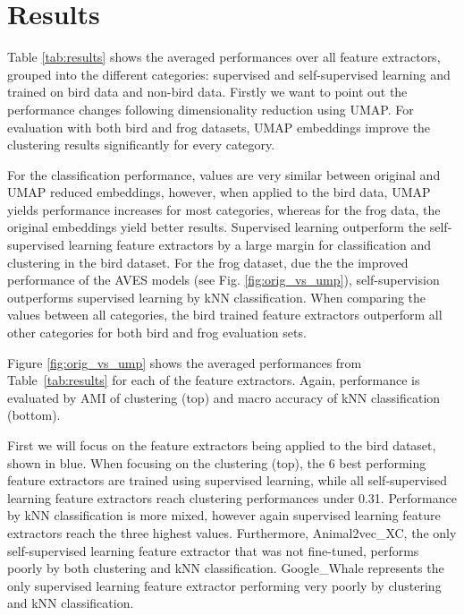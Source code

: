 \section{Results}
\label{sec:results}



Table \ref{tab:results} shows the averaged performances over all feature extractors, grouped into the different categories: supervised and self-supervised learning and trained on bird data and non-bird data.
Firstly we want to point out the performance changes following dimensionality reduction using UMAP.
For evaluation with both bird and frog datasets, UMAP embeddings improve the clustering results significantly for every category.

For the classification performance, values are very similar between original and UMAP reduced embeddings, however, when applied to the bird data, UMAP yields performance increases for most categories, whereas for the frog data, the original embeddings yield better results.
Supervised learning outperform the self-supervised learning feature extractors by a large margin for classification and clustering in the bird dataset.
For the frog dataset, due the the improved performance of the AVES models (see Fig. \ref{fig:orig_vs_ump}), self-supervision outperforms supervised learning by kNN classification.
When comparing the values between all categories, the bird trained feature extractors outperform all other categories for both bird and frog evaluation sets.




Figure \ref{fig:orig_vs_ump} shows the averaged performances from Table~\ref{tab:results} for each of the feature extractors.
Again, performance is evaluated by AMI of clustering (top) and macro accuracy of kNN classification (bottom).

First we will focus on the feature extractors being applied to the bird dataset, shown in blue.
When focusing on the clustering (top), the 6 best performing feature extractors are trained using supervised learning, while all self-supervised learning feature extractors reach clustering performances under 0.31.
Performance by kNN classification is more mixed, however again supervised learning feature extractors reach the three highest values.
Furthermore, Animal2vec\_XC, the only self-supervised learning feature extractor that was not fine-tuned, performs poorly by both clustering and kNN classification.
Google\_Whale represents the only supervised learning feature extractor performing very poorly by clustering and kNN classification.

